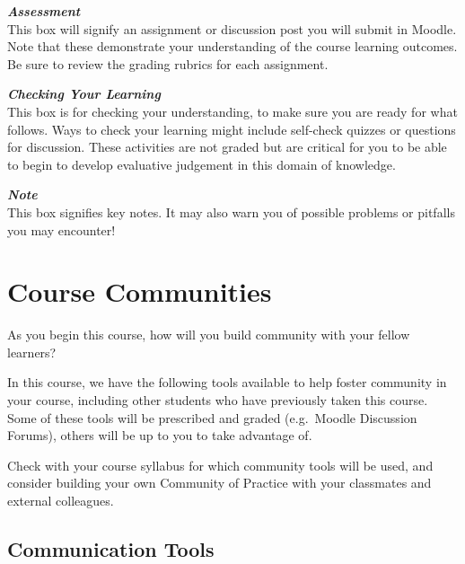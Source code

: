 \documentclass[
]{book}
\begin{document}
\begin{assessment}
\textbf{\emph{Assessment}}\\
This box will signify an assignment or discussion post you will submit in Moodle. Note that these demonstrate your understanding of the course learning outcomes. Be sure to review the grading rubrics for each assignment.
\end{assessment}

\begin{progress}
\textbf{\emph{Checking Your Learning}}\\
This box is for checking your understanding, to make sure you are ready for what follows. Ways to check your learning might include self-check quizzes or questions for discussion. These activities are not graded but are critical for you to be able to begin to develop evaluative judgement in this domain of knowledge.
\end{progress}

\begin{caution}
\textbf{\emph{Note}}\\
This box signifies key notes. It may also warn you of possible problems or pitfalls you may encounter!
\end{caution}

\hypertarget{course-communities}{%
\chapter*{Course Communities}\label{course-communities}}

As you begin this course, how will you build community with your fellow learners?

In this course, we have the following tools available to help foster community in your course, including other students who have previously taken this course. Some of these tools will be prescribed and graded (e.g.~Moodle Discussion Forums), others will be up to you to take advantage of.

Check with your course syllabus for which community tools will be used, and consider building your own Community of Practice with your classmates and external colleagues.

\hypertarget{communication-tools}{%
\section*{Communication Tools}\label{communication-tools}}
\end{document}
